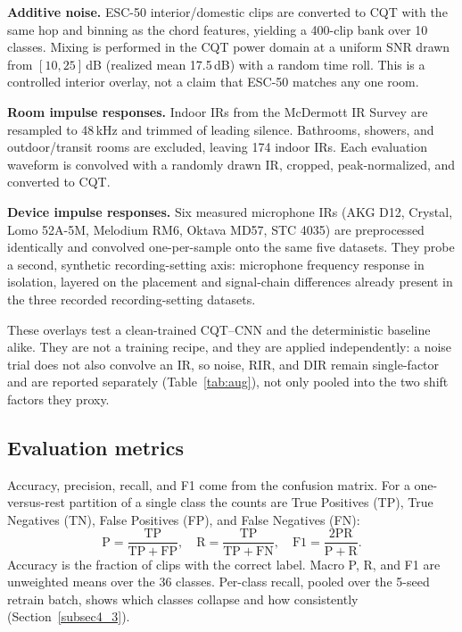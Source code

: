 \documentclass[pdflatex,sn-mathphys-num,iicol]{sn-jnl}
\theoremstyle{thmstyleone}
\theoremstyle{thmstyletwo}
\theoremstyle{thmstylethree}
\begin{document}
\textbf{Additive noise.} ESC-50 interior/domestic clips \cite{Piczak2015} are converted to CQT with the same hop and binning as the chord features, yielding a 400-clip bank over 10 classes. Mixing is performed in the CQT power domain at a uniform SNR drawn from $[10, 25]$\,dB (realized mean 17.5\,dB) with a random time roll. This is a controlled interior overlay, not a claim that ESC-50 matches any one room.

\textbf{Room impulse responses.} Indoor IRs from the McDermott IR Survey \cite{Traer2016} are resampled to 48\,kHz and trimmed of leading silence. Bathrooms, showers, and outdoor/transit rooms are excluded, leaving 174 indoor IRs. Each evaluation waveform is convolved with a randomly drawn IR, cropped, peak-normalized, and converted to CQT.

\textbf{Device impulse responses.} Six measured microphone IRs (AKG D12, Crystal, Lomo 52A-5M, Melodium RM6, Oktava MD57, STC 4035) are preprocessed identically and convolved one-per-sample onto the same five datasets. They probe a second, synthetic recording-setting axis: microphone frequency response in isolation, layered on the placement and signal-chain differences already present in the three recorded recording-setting datasets.

These overlays test a clean-trained CQT--CNN and the deterministic baseline alike. They are not a training recipe, and they are applied independently: a noise trial does not also convolve an IR, so noise, RIR, and DIR remain single-factor and are reported separately (Table~\ref{tab:aug}), not only pooled into the two shift factors they proxy.

\subsection{Evaluation metrics}\label{subsec3_6}

Accuracy, precision, recall, and F1 come from the confusion matrix. For a one-versus-rest partition of a single class the counts are True Positives (TP), True Negatives (TN), False Positives (FP), and False Negatives (FN):
\begin{equation}
\mathrm{P}=\frac{\mathrm{TP}}{\mathrm{TP}+\mathrm{FP}},\quad
\mathrm{R}=\frac{\mathrm{TP}}{\mathrm{TP}+\mathrm{FN}},\quad
\mathrm{F1}=\frac{2\mathrm{PR}}{\mathrm{P}+\mathrm{R}}.
\label{eq:prf}
\end{equation}
Accuracy is the fraction of clips with the correct label. Macro P, R, and F1 are unweighted means over the 36 classes. Per-class recall, pooled over the 5-seed retrain batch, shows which classes collapse and how consistently (Section~\ref{subsec4_3}).
\end{document}
